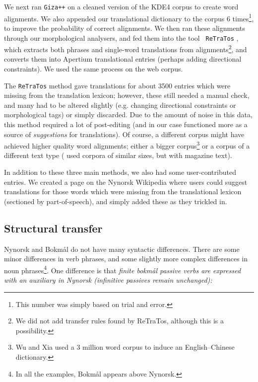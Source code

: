 \documentclass[11pt]{article}
\begin{document}
We next ran {\tt \small Giza++} \citep{och2003scv} on a cleaned
version of the KDE4 corpus to create word alignments. We also appended
our translational dictionary to the corpus 6 times\footnote{This
  number was simply based on trial and error.}, to improve the
probability of correct alignments. We then ran these alignments
through our morphological analysers, and fed them into the tool {\tt
  \small ReTraTos} \citep{caseli2006aib}, which extracts both phrases
and single-word translations from alignments\footnote{We did not add
  transfer rules found by ReTraTos, although this is a possibility.},
and converts them into Apertium translational entries (perhaps adding
directional constraints).  We used the same process on the web corpus.

The {\tt \small ReTraTos} method gave translations for about 3500
entries which were missing from the translation lexicon; however,
these still needed a manual check, and many had to be altered
slightly (e.g.  changing directional constraints or morphological
tags) or simply discarded. Due to the amount of noise in this data,
this method required a lot of post-editing (and in our case functioned
more as a source of \emph{suggestions} for translations). Of course, a
different corpus might have achieved higher quality word alignments;
either a bigger corpus\footnote{Wu and Xia \citep[1994,
in][p.~230]{caseli2006aib} used a 3 million word corpus to induce an
English–Chinese dictionary.} or a corpus of a different text type
(\citet{caseli2006aib} used corpora of similar sizes, but with
magazine text).

In addition to these three main methods, we also had some
user-contributed entries. We created a page on the Nynorsk Wikipedia
where users could suggest translations for those words which were
missing from the translational lexicon (sectioned by part-of-speech), and
simply added these as they trickled in.


\subsection{Structural transfer}
\label{sec:structural-transfer}
Nynorsk and Bokmål do not have many syntactic differences. There
are some minor differences in verb phrases, and some slightly more
complex differences in noun phrases\footnote{In all the examples,
  Bokmål appears above Nynorsk.}. One difference is that \emph{finite
  bokmål passive verbs are expressed with an auxiliary in Nynorsk
  (infinitive passives remain unchanged):}
\end{document}
